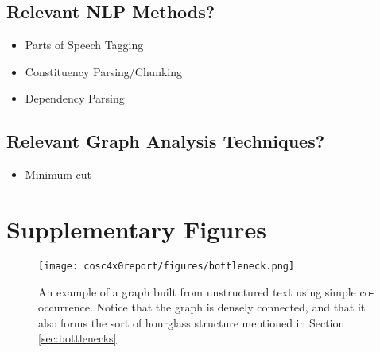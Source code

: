 \documentclass[12pt]{article}
\begin{document}
\subsection{Relevant NLP Methods?}
\begin{itemize}
    \item Parts of Speech Tagging
    \item Constituency Parsing/Chunking
    \item Dependency Parsing
\end{itemize}

\subsection{Relevant Graph Analysis Techniques?}
\begin{itemize}
    \item Minimum cut
\end{itemize}


\section{Supplementary Figures} \label{sec:supplementary figures}

\begin{sidewaysfigure}
    \centering
    \texttt{[image: cosc4x0report/figures/bottleneck.png]}
    \caption{An example of a graph built from unstructured text using simple co-occurrence. Notice that the graph is densely connected, and that it also forms the sort of hourglass structure mentioned in Section \ref{sec:bottlenecks}}
    \label{fig:bottleneck example}
\end{sidewaysfigure}
\end{document}
